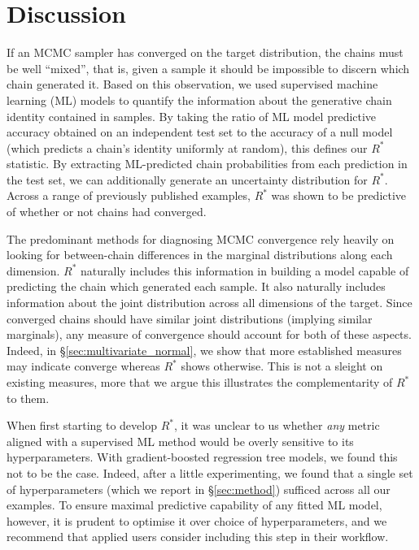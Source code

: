 \documentclass{article}
\begin{document}
\section{Discussion}
If an MCMC sampler has converged on the target distribution, the chains must be well ``mixed'', that is, given a sample it should be impossible to discern which chain generated it. Based on this observation, we used supervised machine learning (ML) models to quantify the information about the generative chain identity contained in samples. By taking the ratio of ML model predictive accuracy obtained on an independent test set to the accuracy of a null model (which predicts a chain's identity uniformly at random), this defines our $R^*$ statistic. By extracting ML-predicted chain probabilities from each prediction in the test set, we can additionally generate an uncertainty distribution for $R^*$. Across a range of previously published examples, $R^*$ was shown to be predictive of whether or not chains had converged.

The predominant methods for diagnosing MCMC convergence rely heavily on looking for between-chain differences in the marginal distributions along each dimension. $R^*$ naturally includes this information in building a model capable of predicting the chain which generated each sample. It also naturally includes information about the joint distribution across all dimensions of the target. Since converged chains should have similar joint distributions (implying similar marginals), any measure of convergence should account for both of these aspects. Indeed, in \S\ref{sec:multivariate_normal}, we show that more established measures may indicate converge whereas $R^*$ shows otherwise. This is not a sleight on existing measures, more that we argue this illustrates the complementarity of $R^*$ to them.

When first starting to develop $R^*$, it was unclear to us whether \textit{any} metric aligned with a supervised ML method would be overly sensitive to its hyperparameters. With gradient-boosted regression tree models, we found this not to be the case. Indeed, after a little experimenting, we found that a single set of hyperparameters (which we report in \S\ref{sec:method}) sufficed across all our examples. To ensure maximal predictive capability of any fitted ML model, however, it is prudent to optimise it over choice of hyperparameters, and we recommend that applied users consider including this step in their workflow.
\end{document}
